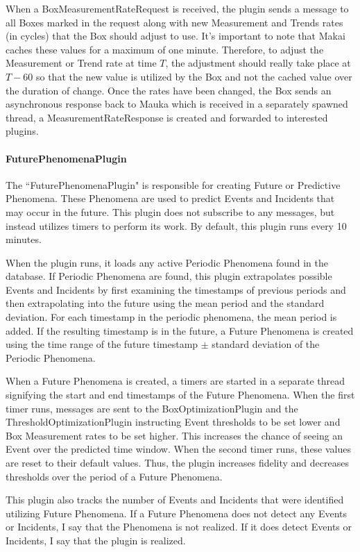 When a BoxMeasurementRateRequest is received, the plugin sends a message to all Boxes marked in the request along with new Measurement and Trends rates (in cycles) that the Box should adjust to use. It's important to note that Makai caches these values for a maximum of one minute. Therefore, to adjust the Measurement or Trend rate at time $T$, the adjustment should really take place at $T - 60$ so that the new value is utilized by the Box and not the cached value over the duration of change. Once the rates have been changed, the Box sends an asynchronous response back to Mauka which is received in a separately spawned thread, a MeasurementRateResponse is created and forwarded to interested plugins.

\paragraph{FuturePhenomenaPlugin}

The ``FuturePhenomenaPlugin" is responsible for creating Future or Predictive Phenomena. These Phenomena are used to predict Events and Incidents that may occur in the future. This plugin does not subscribe to any messages, but instead utilizes timers to perform its work. By default, this plugin runs every 10 minutes.

When the plugin runs, it loads any active Periodic Phenomena found in the database. If Periodic Phenomena are found, this plugin extrapolates possible Events and Incidents by first examining the timestamps of previous periods and then extrapolating into the future using the mean period and the standard deviation. For each timestamp in the periodic phenomena, the mean period is added. If the resulting timestamp is in the future, a Future Phenomena is created using the time range of the future timestamp $\pm$ standard deviation of the Periodic Phenomena.

When a Future Phenomena is created, a timers are started in a separate thread signifying the start and end timestamps of the Future Phenomena. When the first timer runs, messages are sent to the BoxOptimizationPlugin and the ThresholdOptimizationPlugin instructing Event thresholds to be set lower and Box Measurement rates to be set higher. This increases the chance of seeing an Event over the predicted time window. When the second timer runs, these values are reset to their default values. Thus, the plugin increases fidelity and decreases thresholds over the period of a Future Phenomena.

This plugin also tracks the number of Events and Incidents that were identified utilizing Future Phenomena. If a Future Phenomena does not detect any Events or Incidents, I say that the Phenomena is not realized. If it does detect Events or Incidents, I say that the plugin is realized.

